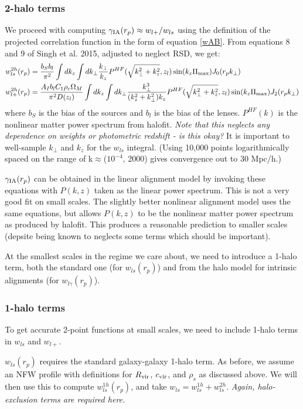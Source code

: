 \documentclass[onecolumn,amsmath,aps,fleqn, superscriptaddress]{revtex4}
\begin{document}
\subsubsection*{2-halo terms}
We proceed with computing $\gamma_{\rm IA}(r_p) \approx w_{l+} / w_{ls}$ using the definition of the projected correlation function in the form of equation \ref{wAB}. From equations 8 and 9 of Singh et al. 2015, adjusted to neglect RSD, we get:
\begin{align}
w_{ls}^{2h}(r_p) &= \frac{b_S b_l}{\pi^2} \int dk_z  \int dk_\perp  \frac{k_\perp}{k_z} P^{HF}(\sqrt{k_\perp^2 + k_z^2}, z_l) \sin(k_z \Pi_{\rm max}) J_0(r_p k_\perp) \nonumber \\
w_{l+}^{2h}(r_p) &= \frac{A_I b_l C_1 \rho_c \Omega_M}{\pi^2 D(z_l)} \int dk_z  \int dk_\perp  \frac{k_\perp^3 }{(k_z^2 + k_\perp^2)k_z} P^{HF}(\sqrt{k_\perp^2 + k_z^2}, z_l) \sin(k_z \Pi_{\rm max}) J_2(r_p k_\perp)
\label{ws}
\end{align}
where $b_S$ is the bias of the sources and $b_l$ is the bias of the lenses. $P^{HF}(k)$ is the nonlinear matter power spectrum from halofit. {\it Note that this neglects any dependence on weights or photometric redshift - is this okay?} It is important to well-sample $k_\perp$ and $k_z$ for the $w_{ls}$ integral. (Using 10,000 points logarithmically spaced on the range of k$\approx$($10^{-4}$, 2000) gives convergence out to $30$ Mpc/h.)

$\gamma_{\rm IA}(r_p)$ can be obtained in the linear alignment model by invoking these equations with $P(k,z)$ taken as the linear power spectrum. This is not a very good fit on small scales. The slightly better nonlinear alignment model uses the same equations, but allows $P(k,z)$ to be the nonlinear matter power spectrum as produced by halofit. This produces a reasonable prediction to smaller scales (depsite being known to neglects some terms which should be important). 

At the smallest scales in the regime we care about, we need to introduce a 1-halo term, both the standard one (for $w_{ls}(r_p)$) and from the halo model for intrinsic alignments (for $w_{l\gamma}(r_p)$). 

\subsubsection*{1-halo terms}
To get accurate 2-point functions at small scales, we need to include 1-halo terms in $w_{ls}$ and $w_{l+}$. 

$w_{ls}(r_p)$ requires the standard galaxy-galaxy 1-halo term. As before, we assume an NFW profile with definitions for $R_{\rm vir}$, $c_{\rm vir}$, and $\rho_s$ as discussed above. We will then use this to compute $w^{1h}_{ls}(r_p)$, and take $w_{ls} = w_{ls}^{1h} + w_{ls}^{2h}$. {\it Again, halo-exclusion terms are required here.} 
\end{document}
